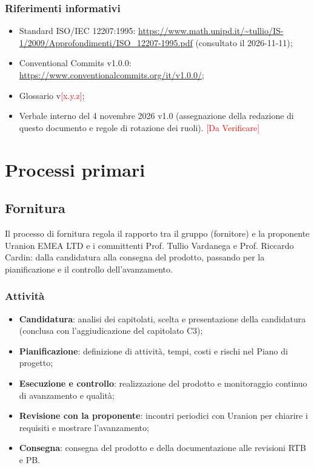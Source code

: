 \documentclass[12pt,a4paper]{article}
\newcommand{\ph}[1]{\textcolor{red}{[#1]}}
\newcommand{\tightlist}{\setlength{\itemsep}{1pt}\setlength{\parskip}{0pt}}
\begin{document}
\subsubsection{Riferimenti informativi}
\begin{itemize}
\tightlist
\item Standard ISO/IEC 12207:1995: \url{https://www.math.unipd.it/~tullio/IS-1/2009/Approfondimenti/ISO_12207-1995.pdf} (consultato il 2026-11-11);
\item Conventional Commits v1.0.0: \url{https://www.conventionalcommits.org/it/v1.0.0/};
\item Glossario v\ph{x.y.z};
\item Verbale interno del 4 novembre 2026 v1.0 (assegnazione della redazione di questo documento e regole di rotazione dei ruoli). \ph{Da Verificare}
\end{itemize}

\section{Processi primari}\label{sec:primari}

\subsection{Fornitura}
Il processo di fornitura regola il rapporto tra il gruppo (fornitore) e la proponente Uranion EMEA LTD e i committenti Prof. Tullio Vardanega e Prof. Riccardo Cardin: dalla candidatura alla consegna del prodotto, passando per la pianificazione e il controllo dell'avanzamento.

\subsubsection{Attività}
\begin{itemize}
\tightlist
\item \textbf{Candidatura}: analisi dei capitolati, scelta e presentazione della candidatura (conclusa con l'aggiudicazione del capitolato C3);
\item \textbf{Pianificazione}: definizione di attività, tempi, costi e rischi nel Piano di progetto;
\item \textbf{Esecuzione e controllo}: realizzazione del prodotto e monitoraggio continuo di avanzamento e qualità;
\item \textbf{Revisione con la proponente}: incontri periodici con Uranion per chiarire i requisiti e mostrare l'avanzamento;
\item \textbf{Consegna}: consegna del prodotto e della documentazione alle revisioni RTB e PB.
\end{itemize}
\end{document}
